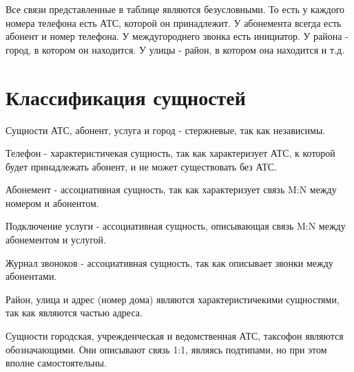 \documentclass{report}
\begin{document}
Все связи представленные в таблице являются безусловными. То есть у каждого 
номера телефона есть АТС, которой он принадлежит. У абонемента всегда
есть абонент и номер телефона. У междугороднего звонка есть инициатор. 
У района - город, в котором он находится. У улицы - район, в котором она 
находится и т.д.

\section{Классификация сущностей}

Сущности АТС, абонент, услуга и город - стержневые, так как независимы. 

Телефон - характеристичекая сущность, 
так как характеризует АТС, к которой будет принадлежать абонент, и не может
существовать без АТС.

Абонемент - ассоциативная сущность, так как характеризует связь M:N между номером и абонентом.

Подключение услуги - ассоциативная сущность, описывающая связь M:N между 
абонементом и услугой.

Журнал звоноков - ассоциативная сущность, так как 
описывает звонки между абонентами.

Район, улица и адрес (номер дома) являются характеристичекими сущностями, 
так как являются частью адреса.

Сущности городская, учрежденческая и ведомственная АТС, таксофон являются
обозначающими. Они описывают связь 1:1, являясь подтипами, но при 
этом вполне самостоятельны. 
\end{document}
